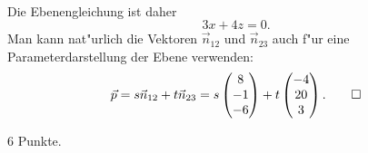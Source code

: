 \begin{loesung}
\begin{align*}
\end{align*}
Die Ebenengleichung ist daher
\[
3x+4z=0.
\]
Man kann nat"urlich die Vektoren ${\vec n}_{12}$ und ${\vec n}_{23}$
auch f"ur eine Parameterdarstellung der Ebene verwenden:
\[
\vec p
=
s {\vec n}_{12} + t {\vec n}_{23}
=
s\begin{pmatrix} 8\\-1\\-6 \end{pmatrix}
+
t\begin{pmatrix} -4\\20\\3 \end{pmatrix}.
\qedhere
\]
\end{loesung}

\begin{bewertung}
6 Punkte.
\end{bewertung}

